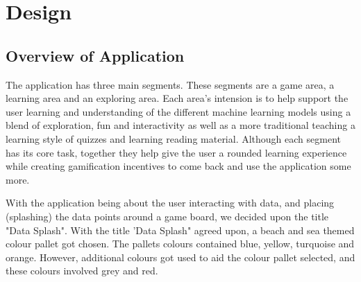 \chapter{Design}
	\label{chap:methodology}
		

	\section{Overview of Application}
		
	The application has three main segments. These segments are a game area, a learning area and an exploring area. Each area's intension is to help support the user learning and understanding of the different machine learning models using a blend of exploration, fun and interactivity as well as a more traditional teaching a learning style of quizzes and learning reading material. Although each segment has its core task, together they help give the user a rounded learning experience while creating gamification incentives to come back and use the application some more.
	
	With the application being about the user interacting with data, and placing (splashing) the data points around a game board, we decided upon the title "Data Splash". With the title 'Data Splash" agreed upon, a beach and sea themed colour pallet got chosen. The pallets colours contained blue, yellow, turquoise and orange. However, additional colours got used to aid the colour pallet selected, and these colours involved grey and red.
	
